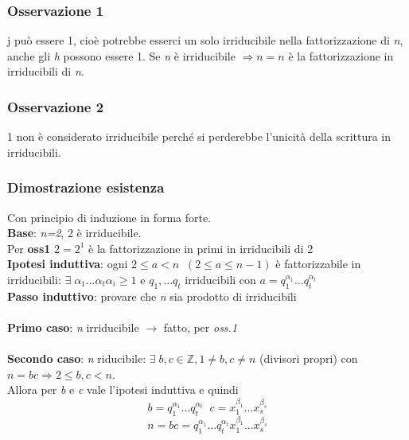 \subsubsection{Osservazione 1}
j può essere 1, cioè potrebbe esserci un solo irriducibile nella fattorizzazione di \textit{n}, anche gli \textit{h} possono essere 1.
Se \textit{n} è irriducibile \(\Rightarrow n=n\) è la fattorizzazione in irriducibili di \textit{n}.

\subsubsection{Osservazione 2}
1 non è considerato irriducibile perché si perderebbe l'unicità della scrittura in irriducibili.

\subsubsection{Dimostrazione esistenza}
Con principio di induzione in forma forte.
\\
\textbf{Base}: \textit{n=2}, 2 è irriducibile.
\\
Per \textbf{oss1} \(2=2^1\) è la fattorizzazione in primi in irriducibili di 2
\\
\textbf{Ipotesi induttiva}: ogni \(2\leq a<n\;\;(2\leq a\leq n-1)\) è fattorizzabile in irriducibili: \(\exists\; \alpha _1...\alpha _t \alpha _i\geq 1\) e \(q_1,...q_t\) irriducibili con \(a=q^{\alpha _1}_1...q_t^{\alpha _t}\)
\\
\textbf{Passo induttivo}: provare che \textit{n} sia prodotto di irriducibili
\\\\
\textbf{Primo caso}: \textit{n} irriducibile \(\rightarrow\) fatto, per \textit{oss.1}
\\\\
\textbf{Secondo caso}: \textit{n} riducibile: \(\exists\;b,c\in\mathbb{Z}, 1\neq b, c\neq n\) (divisori propri) con \(n=bc\Rightarrow 2\leq b,c<n\).
\\
Allora per \textit{b} e \textit{c} vale l'ipotesi induttiva e quindi
\[b=q_1^{\alpha _1}...q_t^{\alpha _t}\;\; c= x_1^{\beta _1}...x_s^{\beta _s}\]
\[n=bc=q_1^{\alpha _1}...q_t^{\alpha _t} x_1^{\beta _1}...x_s^{\beta _s}\]

